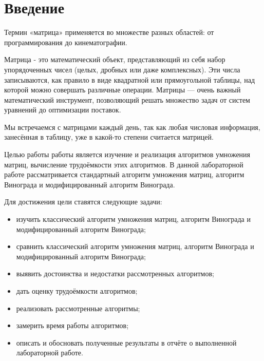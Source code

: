 \section*{Введение}
Термин «матрица» применяется во множестве разных областей: от программирования до кинематографии.

Матрица - это математический объект, представляющий из себя набор упорядоченных чисел (целых, дробных или даже комплексных). Эти числа записываются, как правило в виде квадратной или прямоугольной таблицы, над которой можно совершать различные операции. Матрицы — очень важный математический инструмент, позволяющий решать множество задач от систем уравнений до оптимизации поставок.

Мы встречаемся с матрицами каждый день, так как любая числовая информация, занесённая в таблицу, уже в какой-то степени считается матрицей.

Целью работы работы является изучение и реализация алгоритмов умножения матриц, вычисление трудоёмкости этих алгоритмов. В данной лабораторной работе рассматривается стандартный алгоритм умножения матриц, алгоритм Винограда и модифицированный алгоритм Винограда.

Для достижения цели ставятся следующие задачи:
\begin{itemize}
    \item изучить классический алгоритм умножения матриц, алгоритм Винограда и модифицированный алгоритм Винограда;
    \item сравнить классический алгоритм умножения матриц, алгоритм Винограда и модифицированный алгоритм Винограда;
    \item выявить достоинства и недостатки рассмотренных алгоритмов;
    \item дать оценку трудоёмкости алгоритмов;
    \item реализовать рассмотренные алгоритмы;
    \item замерить время работы алгоритмов;
    \item описать и обосновать полученные результаты в отчёте о выполненной лабораторной
работе. 
\end{itemize}